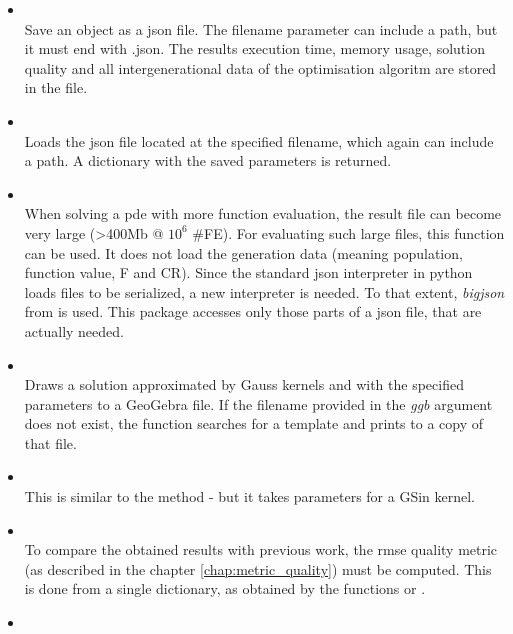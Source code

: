 \documentclass[./\jobname.tex]{subfiles}
\begin{document}
\begin{itemize}
	\item 
	 \\
	Save an  object as a \gls{json} file. The filename parameter can include a path, but it must end with .json. The results execution time, memory usage, solution quality and all intergenerational data of the optimisation algoritm are stored in the file. 
	\item {} \\
	Loads the \gls{json} file located at the specified filename, which again can include a path. A dictionary with the saved  parameters is returned. 
	\item 
	 \\
	When solving a \gls{pde} with more function evaluation, the result file can become very large (>400Mb @ $10^6$ \#FE). For evaluating such large files, this function can be used. It does not load the generation data (meaning population, function value, F and CR). Since the standard json interpreter in python loads files to be serialized, a new interpreter is needed. To that extent, \textit{bigjson} from \cite{heino_henubigjson_2020} is used. This package accesses only those parts of a json file, that are actually needed.
	\item {} \\
	Draws a solution approximated by Gauss kernels and with the specified parameters to a GeoGebra file. If the filename provided in the \textit{ggb} argument does not exist, the function searches for a template and prints to a copy of that file. 
	\item {} \\
	This is similar to the  method - but it takes parameters for a GSin kernel. 
	\item 
	 \\
	To compare the obtained results with previous work, the \gls{rmse} quality metric (as described in the chapter \ref{chap:metric_quality}) must be computed. This is done from a single dictionary, as obtained by the functions  or .
	\item 
	 \\

\end{itemize}
\end{document}

